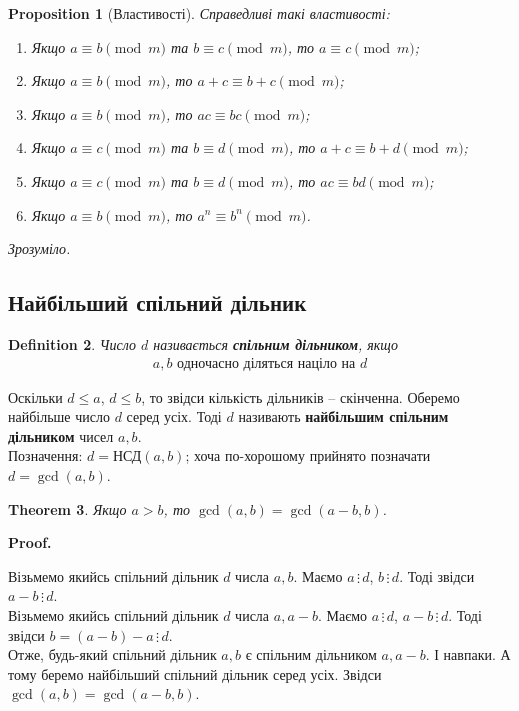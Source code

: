 \documentclass[a4paper, 10pt]{article}
\makeatletter
\def\qed{$\blacksquare$}
\theoremstyle{theoremdd}
\newtheorem{theorem}{Theorem}[subsection]
\theoremstyle{theoremdd}
\newtheorem{definition}[theorem]{Definition}
\theoremstyle{theoremdd}
\theoremstyle{theoremdd}
\theoremstyle{theoremdd}
\newtheorem{proposition}[theorem]{Proposition}
\theoremstyle{theoremdd}
\theoremstyle{theoremdd}
\theoremstyle{theoremdd}
\renewenvironment{proof}[1][Proof.\\]{\par
\pushQED{\hfill \qed}%
\normalfont \topsep6\p@\@plus6\p@\relax
\trivlist
\item\relax
{\bfseries
#1\@addpunct{.}}\hspace\labelsep\ignorespaces
}{%
\popQED\endtrivlist\@endpefalse
}
\newcommand\divisibleBy{\, \vdots \,}
\makeatother
\begin{document}
\begin{proposition}[Властивості]
Справедливі такі властивості:
\begin{enumerate}[nosep,wide=0pt,label={\arabic*)}]
\item Якщо $a \equiv b \pmod m$ та $b \equiv c \pmod m$, то $a \equiv c \pmod m$;
\item Якщо $a \equiv b \pmod m$, то $a+c \equiv b+c \pmod m$;
\item Якщо $a \equiv b \pmod m$, то $ac \equiv bc \pmod m$;
\item Якщо $a \equiv c \pmod m$ та $b \equiv d \pmod m$, то $a+c \equiv b+d \pmod m$;
\item Якщо $a \equiv c \pmod m$ та $b \equiv d \pmod m$, то $ac \equiv bd \pmod m$;
\item Якщо $a \equiv b \pmod m$, то $a^n \equiv b^n \pmod m$.
\end{enumerate}
\textit{Зрозуміло.}
\end{proposition}

\subsection{Найбільший спільний дільник}
\begin{definition}
Число $d$ називається \textbf{спільним дільником}, якщо
\begin{align*}
\text{$a,b$ одночасно діляться націло на $d$}
\end{align*}
\end{definition}

Оскільки $d \leq a$, $d \leq b$, то звідси кількість дільників -- скінченна. Оберемо найбільше число $d$ серед усіх. Тоді $d$ називають \textbf{найбільшим спільним дільником} чисел $a,b$.\\
Позначення: $d = \text{НСД}(a,b)$; хоча по-хорошому прийнято позначати $d = \gcd(a,b)$.

\begin{theorem}
Якщо $a>b$, то $\gcd(a,b) = \gcd(a-b,b)$.
\end{theorem}

\begin{proof}
Візьмемо якийсь спільний дільник $d$ числа $a,b$. Маємо $a \divisibleBy d$, $b \divisibleBy d$. Тоді звідси $a-b \divisibleBy d$.\\
Візьмемо якийсь спільний дільник $d$ числа $a,a-b$. Маємо $a \divisibleBy d$, $a - b \divisibleBy d$. Тоді звідси $b = (a-b) -a \divisibleBy d$.\\
Отже, будь-який спільний дільник $a,b$ є спільним дільником $a,a-b$. І навпаки. А тому беремо найбільший спільний дільник серед усіх. Звідси $\gcd(a,b) = \gcd(a-b,b)$.
\end{proof}
\end{document}
